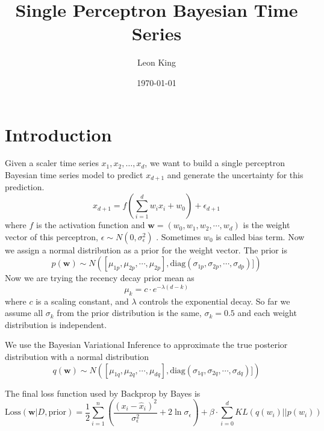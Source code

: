 \documentclass{article}
\title{Single Perceptron Bayesian Time Series}
\author{Leon King}
\date{\today} %
\begin{document}
\maketitle

\section{Introduction}

Given a scaler time series $x_1, x_2, \dots, x_d$, we want to build a single perceptron Bayesian time series model to predict $x_{d+1}$ and generate the uncertainty for this prediction. $$x_{d+1} = f\left(\sum_{i=1}^dw_i x_i + w_0\right) + \epsilon_{d+1}$$ where $f$ is the activation function and $\mathbf{w}=(w_0,w_1,w_2,\cdots, w_d)$ is the weight vector of this perceptron, $\epsilon \sim N(0, \sigma^2_\epsilon)$ . Sometimes $w_0$ is called bias term. Now we assign a normal distribution as a prior for the weight vector. The prior is $$p(\mathbf{w})\sim N\left([\mu_{1p},\mu_{2p},\cdots,\mu_{2p}], \text{diag}(\sigma_{1p}, \sigma_{2p}, \cdots,\sigma_{dp})]\right)$$
Now we are trying the recency decay prior mean as $$\mu_k = c\cdot e^{-\lambda(d-k)}$$ where $c$ is a scaling constant, and $\lambda$ controls the exponential decay. So far we assume all $\sigma_k$ from the prior distribution is the same, $\sigma_k = 0.5$ and each weight distribution is independent.

We use the Bayesian Variational Inference to approximate the true posterior distribution with a normal distribution $$q(\mathbf{w})\sim N\left([\mu_{1q},\mu_{2q},\cdots,\mu_{dq}], \text{diag}(\sigma_{1q}, \sigma_{2q}, \cdots,\sigma_{dq})]\right)$$

The final loss function used by Backprop by Bayes is $$\text{Loss}(\textbf{w}|D, \text{prior})=\frac{1}{2} \sum_{i=1}^n\left(\frac{\left(x_i-\hat{x}_i\right)^2}{\sigma_{\epsilon}^2}+2 \ln \sigma_{\epsilon}\right) + \beta \cdot \sum_{i=0}^dKL\left(q(w_i)||p(w_i)\right)$$
\end{document}
